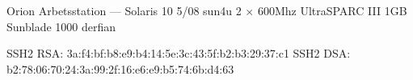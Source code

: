 \documentclass[a5paper]{article}
\begin{document}
   \computerdescription
       {Orion}
       {Arbetsstation}
       {---}
       {Solaris 10 5/08}
       {sun4u}
       {2 $\times$ 600Mhz UltraSPARC III}
       {1GB}
       {Sunblade 1000}
       {derfian}



   \sshfingerprintheading
   \begin{sshfingerprint}
SSH2 RSA: 3a:f4:bf:b8:e9:b4:14:5e:3c:43:5f:b2:b3:29:37:c1
SSH2 DSA: b2:78:06:70:24:3a:99:2f:16:e6:e9:b5:74:6b:d4:63
   \end{sshfingerprint}
\end{document}

